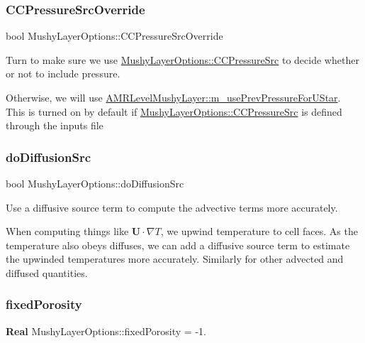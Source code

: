 \subsubsection{\texorpdfstring{C\+C\+Pressure\+Src\+Override}{CCPressureSrcOverride}}
{\footnotesize\ttfamily bool Mushy\+Layer\+Options\+::\+C\+C\+Pressure\+Src\+Override}



Turn to make sure we use \hyperlink{struct_mushy_layer_options_ab873fea567aee972e6604297009cd0be}{Mushy\+Layer\+Options\+::\+C\+C\+Pressure\+Src} to decide whether or not to include pressure. 

Otherwise, we will use \hyperlink{class_a_m_r_level_mushy_layer_af6dd293bd80f201846fc7d6fe6f851b1}{A\+M\+R\+Level\+Mushy\+Layer\+::m\+\_\+use\+Prev\+Pressure\+For\+U\+Star}. This is turned on by default if \hyperlink{struct_mushy_layer_options_ab873fea567aee972e6604297009cd0be}{Mushy\+Layer\+Options\+::\+C\+C\+Pressure\+Src} is defined through the inputs file \mbox{\label{struct_mushy_layer_options_a0631b4a1d95690c036da9a09d6042aa8}} 
\subsubsection{\texorpdfstring{do\+Diffusion\+Src}{doDiffusionSrc}}
{\footnotesize\ttfamily bool Mushy\+Layer\+Options\+::do\+Diffusion\+Src}



Use a diffusive source term to compute the advective terms more accurately. 

When computing things like $ \mathbf{U} \cdot \nabla T $, we upwind temperature to cell faces. As the temperature also obeys diffuses, we can add a diffusive source term to estimate the upwinded temperatures more accurately. Similarly for other advected and diffused quantities. \mbox{\label{struct_mushy_layer_options_a86277f0b87bcf72bbe6b9c78c0da8acf}} 
\subsubsection{\texorpdfstring{fixed\+Porosity}{fixedPorosity}}
{\footnotesize\ttfamily \textbf{ Real} Mushy\+Layer\+Options\+::fixed\+Porosity = -\/1.}




